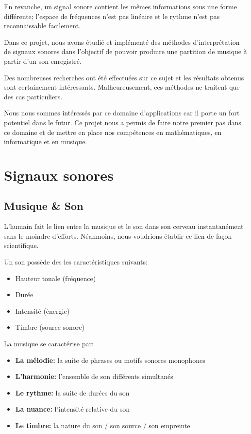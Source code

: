 \documentclass[]{article}
\providecommand{\tightlist}{%
  \setlength{\itemsep}{0pt}\setlength{\parskip}{0pt}}
\begin{document}
En revanche, un signal sonore contient les mêmes informations sous une
forme différente; l'espace de fréquences n'est pas linéaire et le rythme
n'est pas reconnaissable facilement.

Dans ce projet, nous avons étudié et implémenté des méthodes
d'interprétation de signaux sonores dans l'objectif de pouvoir produire
une partition de musique à partir d'un son enregistré.

Des nombreuses recherches ont été effectuées sur ce sujet et les
résultats obtenus sont certainement intéressants. Malheureusement, ces
méthodes ne traitent que des cas particuliers.

Nous nous sommes intéressés par ce domaine d'applications car il porte
un fort potentiel dans le futur. Ce projet nous a permis de faire notre
premier pas dans ce domaine et de mettre en place nos compétences en
mathématiques, en informatique et en musique.

\pagebreak

\hypertarget{signaux-sonores}{%
\section{Signaux sonores}\label{signaux-sonores}}

\hypertarget{musique-son}{%
\subsection{Musique \& Son}\label{musique-son}}

L'humain fait le lien entre la musique et le son dans son cerveau
instantanément sans le moindre d'efforts. Néanmoins, nous voudrions
établir ce lien de façon scientifique.

Un son possède des les caractéristiques suivants:

\begin{itemize}
\tightlist
\item
  Hauteur tonale (fréquence)
\item
  Durée
\item
  Intensité (énergie)
\item
  Timbre (source sonore)
\end{itemize}

La musique se caractérise par:

\begin{itemize}
\tightlist
\item
  \textbf{La mélodie:} la suite de phrases ou motifs sonores monophones
\item
  \textbf{L'harmonie:} l'ensemble de son différents simultanés
\item
  \textbf{Le rythme:} la suite de durées du son
\item
  \textbf{La nuance:} l'intensité relative du son
\item
  \textbf{Le timbre:} la nature du son / son source / son empreinte
\end{itemize}
\end{document}
